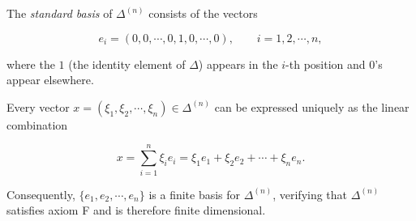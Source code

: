 The \emph{standard basis} of $\Delta^{(n)}$ consists of the vectors

$$e_i = (0, 0, \cdots, 0, 1, 0, \cdots, 0), \qquad i = 1, 2, \cdots, n,$$

where the $1$ (the identity element of $\Delta$) appears in the $i$-th position and $0$'s appear elsewhere.

Every vector $x = (\xi_1, \xi_2, \cdots, \xi_n) \in \Delta^{(n)}$ can be expressed uniquely as the linear combination

$$x = \sum_{i=1}^{n} \xi_i e_i = \xi_1 e_1 + \xi_2 e_2 + \cdots + \xi_n e_n.$$

Consequently, $\{e_1, e_2, \cdots, e_n\}$ is a finite basis for $\Delta^{(n)}$, verifying that $\Delta^{(n)}$ satisfies axiom F and is therefore finite dimensional.
